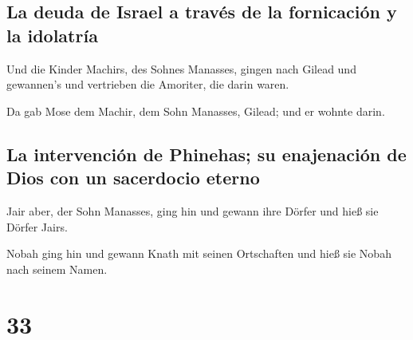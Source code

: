 \hypertarget{la-deuda-de-israel-a-travuxe9s-de-la-fornicaciuxf3n-y-la-idolatruxeda}{%
\subsection{La deuda de Israel a través de la fornicación y la
idolatría}\label{la-deuda-de-israel-a-travuxe9s-de-la-fornicaciuxf3n-y-la-idolatruxeda}}

 Und die Kinder Machirs, des Sohnes Manasses, gingen nach
Gilead und gewannen's und vertrieben die Amoriter, die darin waren.

 Da gab Mose dem Machir, dem Sohn Manasses, Gilead; und
er wohnte darin.

\hypertarget{la-intervenciuxf3n-de-phinehas-su-enajenaciuxf3n-de-dios-con-un-sacerdocio-eterno}{%
\subsection{La intervención de Phinehas; su enajenación de Dios con un
sacerdocio
eterno}\label{la-intervenciuxf3n-de-phinehas-su-enajenaciuxf3n-de-dios-con-un-sacerdocio-eterno}}

 Jair aber, der Sohn Manasses, ging hin und gewann ihre
Dörfer und hieß sie Dörfer Jairs.

 Nobah ging hin und gewann Knath mit seinen Ortschaften
und hieß sie Nobah nach seinem Namen.

\hypertarget{section-32}{%
\section{33}\label{section-32}}

